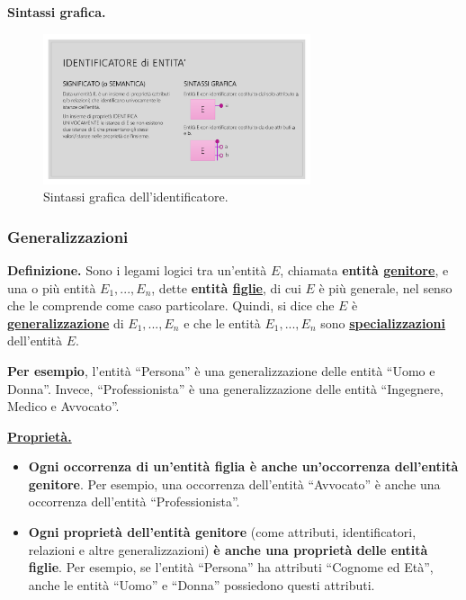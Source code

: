 \documentclass[a4paper]{article}
\newcommand{\dquotes}[1]{``#1''}
\begin{document}
	\newpage

	\noindent
	\textcolor{Green4}{\textbf{Sintassi grafica.}}
	
	\begin{figure}[!htp]
		\centering
		\includegraphics[width=0.7\textwidth]{img/identificatore_def.pdf}
		\caption{Sintassi grafica dell'identificatore.}
	\end{figure}

	\newpage
	
	\subsubsection{Generalizzazioni}
	
	\textcolor{Red3}{\textbf{Definizione.}} Sono i legami logici tra un'entità $E$, chiamata \textbf{entità \underline{genitore}}, e una o più entità $E_{1}, ..., E_{n}$, dette \textbf{entità \underline{figlie}}, di cui $E$ è più generale, nel senso che le comprende come caso particolare. Quindi, si dice che $E$ è \textbf{\underline{generalizzazione}} di $E_{1}, ..., E_{n}$ e che le entità $E_{1}, ..., E_{n}$ sono \textbf{\underline{specializzazioni}} dell'entità $E$.
	
	\textbf{Per esempio}, l'entità \dquotes{Persona} è una generalizzazione delle entità \dquotes{Uomo e Donna}. Invece, \dquotes{Professionista} è una generalizzazione delle entità \dquotes{Ingegnere, Medico e Avvocato}.\newline
	
	\noindent
	\textbf{\underline{Proprietà.}}
	
	\begin{itemize}
		\item \textbf{Ogni occorrenza di un'entità figlia è anche un'occorrenza dell'entità genitore}. Per esempio, una occorrenza dell'entità \dquotes{Avvocato} è anche una occorrenza dell'entità \dquotes{Professionista}.
		
		\item \textbf{Ogni proprietà dell'entità genitore} (come attributi, identificatori, relazioni e altre generalizzazioni) \textbf{è anche una proprietà delle entità figlie}. Per esempio, se l'entità \dquotes{Persona} ha attributi \dquotes{Cognome ed Età}, anche le entità \dquotes{Uomo} e \dquotes{Donna} possiedono questi attributi.
	\end{itemize}
\end{document}
